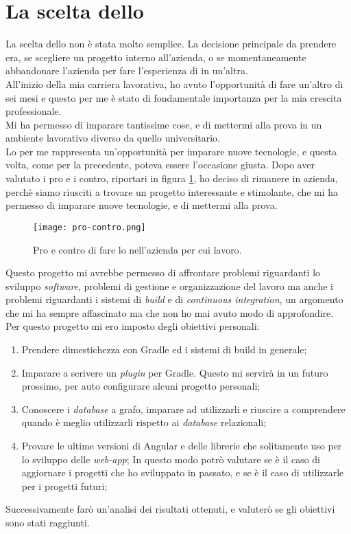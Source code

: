 \section{La scelta dello \stage}
La scelta dello \stage{} non è stata molto semplice. La decisione principale da prendere era, se scegliere un progetto interno all'azienda, o 
se momentaneamente abbandonare l'azienda per fare l'esperienza di \stage{} in un'altra.\\ 
All'inizio della mia carriera lavorativa, ho avuto l'opportunità di fare un'altro \stage{} di sei mesi e questo per me è stato di fondamentale
importanza per la mia crescita professionale.\\ Mi ha permesso di imparare tantissime cose, e di mettermi alla prova in un ambiente lavorativo
diverso da quello universitario.\\ 
Lo \stage{} per me rappresenta un'opportunità per imparare nuove tecnologie, e questa volta, come per la precedente, poteva essere l'occasione giusta. 
Dopo aver valutato i pro e i contro, riportari in figura \ref*{fig:pro-contro}, ho deciso di rimanere in azienda, perchè siamo riusciti
a trovare un progetto interessante e stimolante, che mi ha permesso di imparare nuove tecnologie, e di mettermi alla prova.\\
\begin{figure}[!h] 
  \centering 
  \texttt{[image: pro-contro.png]}
  \caption{Pro e contro di fare lo \stage{} nell'azienda per cui lavoro.}
  \label{fig:pro-contro}
\end{figure}

Questo progetto mi avrebbe permesso di affrontare problemi riguardanti lo sviluppo \textit{software}, problemi di gestione e organizzazione del lavoro ma 
anche i problemi riguardanti i sistemi di \textit{build} e di \textit{continuous integration}, un argomento che mi ha sempre affascinato ma che non ho mai
avuto modo di approfondire.\\
Per questo progetto mi ero imposto degli obiettivi personali:
\begin{enumerate}
  \item Prendere dimestichezza con Gradle ed i sistemi di build in generale;
  \item Imparare a scrivere un \textit{plugin} per Gradle. Questo mi servirà in un futuro prossimo, per auto configurare alcuni progetto personali;
  \item Conoscere i \textit{database} a grafo, imparare ad utilizzarli e riuscire a comprendere quando è meglio utilizzarli rispetto ai \textit{database} relazionali;
  \item Provare le ultime versioni di Angular e delle librerie che solitamente uso per lo sviluppo delle \textit{web-app}; 
      In questo modo potrò valutare se è il caso di aggiornare i progetti che ho sviluppato in passato, e se è il caso di utilizzarle per i progetti futuri;
\end{enumerate}
Successivamente farò un'analisi dei risultati ottenuti, e valuterò se gli obiettivi sono stati raggiunti.\\
